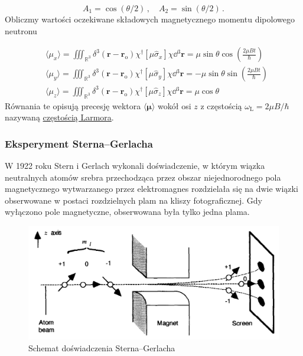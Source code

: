 \documentclass{myclass}
\begin{document}
\begin{equation*}
A_1=\cos(\theta/2)\,,\quad A_2=\sin(\theta/2)\,.
\end{equation*}
Obliczmy wartości oczekiwane składowych magnetycznego momentu dipolowego neutronu

\begin{equation*}
\begin{split}
    &\langle\mu_x\rangle=\iiint_{\mathbb{R}^3}\delta^3(\mathbf{r}-\mathbf{r}_\text{o})\chi^\dag[\mu\hat{\sigma}_x]\chi\dd{^3\mathbf{r}}=\mu\sin\theta\cos\left(\frac{2\mu Bt}{\hbar}\right)\\
    &\langle\mu_y\rangle=\iiint_{\mathbb{R}^3}\delta^3(\mathbf{r}-\mathbf{r}_\text{o})\chi^\dag[\mu\hat{\sigma}_y]\chi\dd{^3\mathbf{r}}=-\mu\sin\theta\sin\left(\frac{2\mu Bt}{\hbar}\right)\\
    &\langle\mu_z\rangle=\iiint_{\mathbb{R}^3}\delta^3(\mathbf{r}-\mathbf{r}_\text{o})\chi^\dag[\mu\hat{\sigma}_z]\chi\dd{^3\mathbf{r}}=\mu\cos\theta
\end{split}
\end{equation*}
Równania te opisują precesję wektora \(\langle\boldsymbol{\mu}\rangle\) wokół osi \(z\) z częstością
\(\boxed{\omega_\text{L}=2\mu B/\hbar}\) nazywaną \underline{częstością Larmora}.

\subsubsection{Eksperyment Sterna--Gerlacha}

W 1922 roku Stern i Gerlach wykonali doświadczenie, w którym wiązka neutralnych atomów srebra
przechodząca przez obszar niejednorodnego pola magnetycznego wytwarzanego przez elektromagnes
rozdzielała się na dwie wiązki obserwowane w postaci rozdzielnych plam na kliszy fotograficznej. Gdy
wyłączono pole magnetyczne, obserwowana była tylko jedna plama.

\begin{figure}[ht]
    \centering
    \includegraphics[scale=0.25]{figs/stern-gerlach.png}
    \caption{Schemat doświadczenia Sterna--Gerlacha}
    \label{fig:stern-gerlach}
\end{figure}
\end{document}
